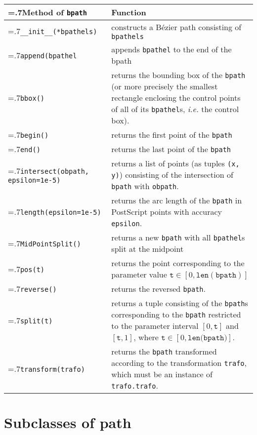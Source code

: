 \medskip
\begin{tabularx}{\linewidth}{>{\hsize=.7\hsize}X>{\raggedright\arraybackslash\hsize=1.3\hsize}X}
  Method of \texttt{bpath} & Function \\
  \hline 
  \texttt{\_\_init\_\_(*bpathels)} &
  constructs a B\'ezier path consisting of \texttt{bpathels}\\
  \texttt{append(bpathel} & appends \texttt{bpathel} to the end of the bpath\\
  \texttt{bbox()} & returns the bounding box of the \texttt{bpath}
  (or more precisely the smallest rectangle enclosing the control
  points of all of its \texttt{bpathel}s, \textit{i.e.} the control
  box).\\
  \texttt{begin()} & returns the first point of the \texttt{bpath}\\
  \texttt{end()} & returns the last point of the \texttt{bpath}\\
  \texttt{intersect(obpath, \newline\phantom{intersect(}epsilon=1e-5)}
  & 
  returns a list of points (as tuples \texttt{(x, y)}) consisting of the intersection of
  \texttt{bpath} with \texttt{obpath}.\\
  \texttt{length(epsilon=1e-5)} & returns the arc length of the \texttt{bpath} in
  PostScript points with accuracy \texttt{epsilon}. \\
  \texttt{MidPointSplit()} & returns a new \texttt{bpath} with all
  \texttt{bpathel}s split at the midpoint\\
  \texttt{pos(t)} & returns the point corresponding to the parameter
  value $\mathtt{t}\in[0, \mathtt{len(bpath)}]$\\
  \texttt{reverse()} & returns the reversed \texttt{bpath}.\\
  \texttt{split(t)} & returns a tuple consisting of the
  \texttt{bpath}s corresponding to the \texttt{bpath} restricted to
  the parameter interval
  $[0,\mathtt{t}]$ and $[\mathtt{t},1]$, where $\mathtt{t}\in[0,\mathtt{len(bpath})]$.\\
  \texttt{transform(trafo)} & returns the \texttt{bpath}
  transformed according to the transformation \texttt{trafo}, which
  must be an instance of
  \texttt{trafo.trafo}.
\end{tabularx}
\medskip


\section{Subclasses of path}

